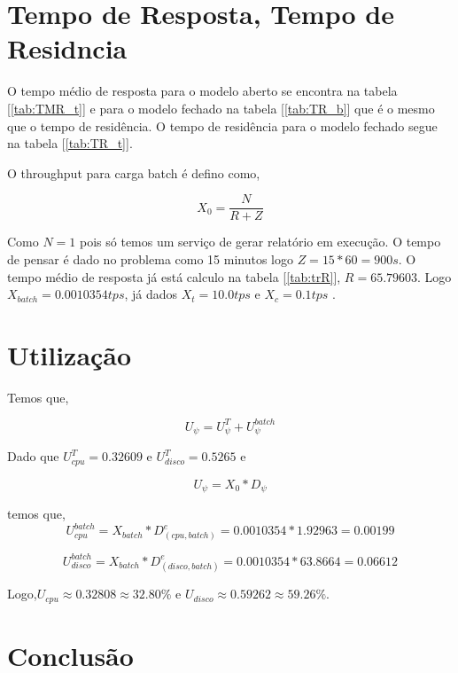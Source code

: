 \documentclass[11pt,a4paper]{abntex2}
\begin{document}
\section*{\textbf{Tempo de Resposta, Tempo de Residncia }}

 O tempo médio de resposta para o modelo aberto se encontra na tabela [\ref{tab:TMR_t}] e para o modelo fechado na tabela [\ref{tab:TR_b}] que é o mesmo que o tempo de residência. O tempo de residência para o modelo fechado segue na tabela [\ref{tab:TR_t}].

O throughput para carga batch é defino como,

\begin{equation}
X_{0} = \frac{N}{R + Z}
\end{equation}

Como $N=1$ pois só temos um serviço de gerar relatório em execução. O tempo de pensar é dado no problema como 15 minutos logo $Z = 15*60 = 900 s$. O tempo médio de resposta já está calculo na tabela [\ref{tab:trR}], $R=65.79603$. Logo $X_{batch}= 0.0010354 tps$, já dados $X_{t}=10.0 tps$ e $X_{c}=0.1 tps$ . 

\section*{\textbf{Utilização}}

Temos que,

\begin{equation}
U_{\psi}  = U^{T}_{\psi} + U^{batch}_{\psi}
\end{equation}

Dado que $U^{T}_{cpu}=0.32609$  e $U^{T}_{disco}=0.5265$ e

\begin{equation}
U_{\psi}  = X_{0}* D_{\psi}
\end{equation}

temos que,
\begin{equation}
U^{batch}_{cpu} = X_{batch}* D^{e}_{(cpu,batch)} = 0.0010354 *1.92963=0.00199 
\end{equation}

\begin{equation}
   U^{batch}_{disco} = X_{batch}* D^{e}_{(disco,batch)} = 0.0010354*63.8664=0.06612 
\end{equation}

Logo,$U_{cpu} \approx 0.32808 \approx 32.80\% $ e  $U_{disco} \approx 0.59262 \approx 59.26\% $.


\section*{\textbf{Conclusão}}
\end{document}
